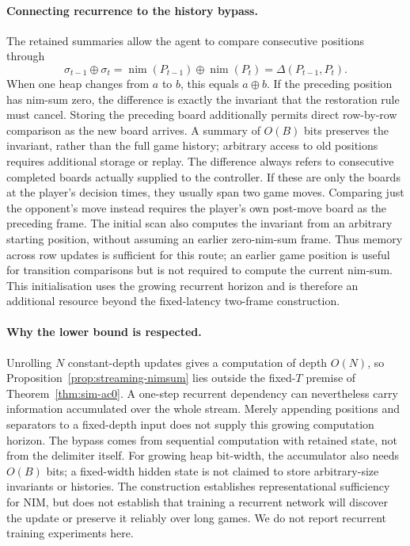 \documentclass[11pt]{article}
\theoremstyle{plain}
\theoremstyle{definition}
\theoremstyle{remark}
\numberwithin{equation}{section}
\begin{document}
\paragraph{Connecting recurrence to the history bypass.}
The retained summaries allow the agent to compare consecutive positions through
\[
\sigma_{t-1}\oplus\sigma_t
=\operatorname{nim}(P_{t-1})\oplus\operatorname{nim}(P_t)
=\Delta(P_{t-1},P_t).
\]
When one heap changes from $a$ to $b$, this equals $a\oplus b$. If the preceding position has nim-sum zero, the difference is exactly the invariant that the restoration rule must cancel. Storing the preceding board additionally permits direct row-by-row comparison as the new board arrives. A summary of $O(B)$ bits preserves the invariant, rather than the full game history; arbitrary access to old positions requires additional storage or replay. The difference always refers to consecutive completed boards actually supplied to the controller. If these are only the boards at the player's decision times, they usually span two game moves. Comparing just the opponent's move instead requires the player's own post-move board as the preceding frame.
The initial scan also computes the invariant from an arbitrary starting position, without assuming an earlier zero-nim-sum frame. Thus memory across row updates is sufficient for this route; an earlier game position is useful for transition comparisons but is not required to compute the current nim-sum. This initialisation uses the growing recurrent horizon and is therefore an additional resource beyond the fixed-latency two-frame construction.

\paragraph{Why the lower bound is respected.}
Unrolling $N$ constant-depth updates gives a computation of depth $O(N)$, so Proposition~\ref{prop:streaming-nimsum} lies outside the fixed-$T$ premise of Theorem~\ref{thm:sim-ac0}. A one-step recurrent dependency can nevertheless carry information accumulated over the whole stream. Merely appending positions and separators to a fixed-depth input does not supply this growing computation horizon. The bypass comes from sequential computation with retained state, not from the delimiter itself.
For growing heap bit-width, the accumulator also needs $O(B)$ bits; a fixed-width hidden state is not claimed to store arbitrary-size invariants or histories. The construction establishes representational sufficiency for NIM, but does not establish that training a recurrent network will discover the update or preserve it reliably over long games. We do not report recurrent training experiments here.
\end{document}

